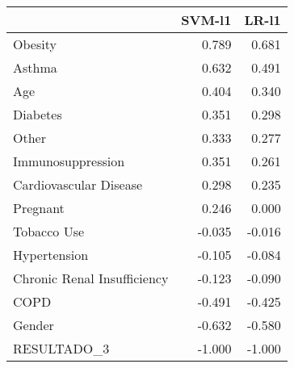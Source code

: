 \begin{tabular}{lrr}
\toprule
{} &  SVM-l1 &  LR-l1 \\
\midrule
Obesity                     &   0.789 &  0.681 \\
Asthma                      &   0.632 &  0.491 \\
Age                         &   0.404 &  0.340 \\
Diabetes                    &   0.351 &  0.298 \\
Other                       &   0.333 &  0.277 \\
Immunosuppression           &   0.351 &  0.261 \\
Cardiovascular Disease      &   0.298 &  0.235 \\
Pregnant                    &   0.246 &  0.000 \\
Tobacco Use                 &  -0.035 & -0.016 \\
Hypertension                &  -0.105 & -0.084 \\
Chronic Renal Insufficiency &  -0.123 & -0.090 \\
COPD                        &  -0.491 & -0.425 \\
Gender                      &  -0.632 & -0.580 \\
RESULTADO\_3                 &  -1.000 & -1.000 \\
\bottomrule
\end{tabular}
